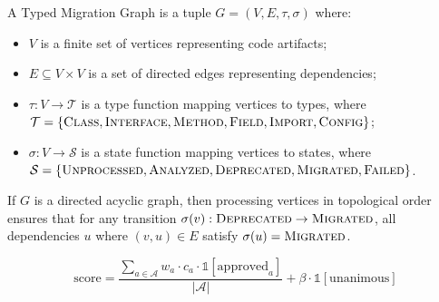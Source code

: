 
\begin{definition}
\label{def:tmg}
A Typed Migration Graph is a tuple $G = (V, E, \tau, \sigma)$ where:
\begin{itemize}
    \item $V$ is a finite set of vertices representing code artifacts;
    \item $E \subseteq V \times V$ is a set of directed edges representing dependencies;
    \item $\tau : V \rightarrow \mathcal{T}$ is a type function mapping vertices to types, where $\mathcal{T} = \{\textsc{Class}, \textsc{Interface}, \textsc{Method}, \textsc{Field}, \textsc{Import}, \textsc{Config}\}$;
    \item $\sigma : V \rightarrow \mathcal{S}$ is a state function mapping vertices to states, where $\mathcal{S} = \{\textsc{Unprocessed}, \textsc{Analyzed}, \textsc{Deprecated}, \textsc{Migrated}, \textsc{Failed}\}$.
\end{itemize}
\end{definition}



\begin{property}
\label{prop:safe-order}
If $G$ is a directed acyclic graph, then processing vertices in topological order ensures that for any transition $\sigma(v) : \textsc{Deprecated} \rightarrow \textsc{Migrated}$, all dependencies $u$ where $(v, u) \in E$ satisfy $\sigma(u) = \textsc{Migrated}$.
\end{property}



\begin{equation}
\label{eq:consensus-score}
\text{score} = \frac{\sum_{a \in \mathcal{A}} w_a \cdot c_a \cdot \mathbb{1}[\text{approved}_a]}{|\mathcal{A}|} + \beta \cdot \mathbb{1}[\text{unanimous}]
\end{equation}

